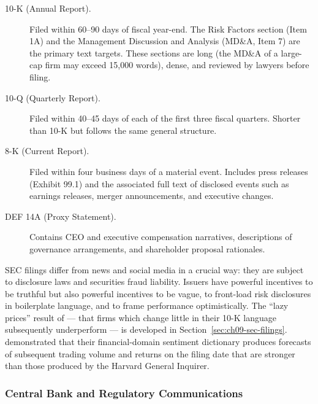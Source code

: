 \begin{description}
  \item[10-K (Annual Report).] Filed within 60--90 days of fiscal year-end. The Risk Factors section (Item 1A) and the Management Discussion and Analysis (MD\&A, Item 7) are the primary text targets. These sections are long (the MD\&A of a large-cap firm may exceed 15,000 words), dense, and reviewed by lawyers before filing.

  \item[10-Q (Quarterly Report).] Filed within 40--45 days of each of the first three fiscal quarters. Shorter than 10-K but follows the same general structure.

  \item[8-K (Current Report).] Filed within four business days of a material event. Includes press releases (Exhibit 99.1) and the associated full text of disclosed events such as earnings releases, merger announcements, and executive changes.

  \item[DEF 14A (Proxy Statement).] Contains CEO and executive compensation narratives, descriptions of governance arrangements, and shareholder proposal rationales.
\end{description}

SEC filings differ from news and social media in a crucial way: they are subject to disclosure laws and securities fraud liability. Issuers have powerful incentives to be truthful but also powerful incentives to be vague, to front-load risk disclosures in boilerplate language, and to frame performance optimistically. The ``lazy prices'' result of \citet{cohen2020lazy} --- that firms which change little in their 10-K language subsequently underperform --- is developed in Section~\ref{sec:ch09-sec-filings}. \citet{loughran2011liability} demonstrated that their financial-domain sentiment dictionary produces forecasts of subsequent trading volume and returns on the filing date that are stronger than those produced by the Harvard General Inquirer.

\subsubsection*{Central Bank and Regulatory Communications}

